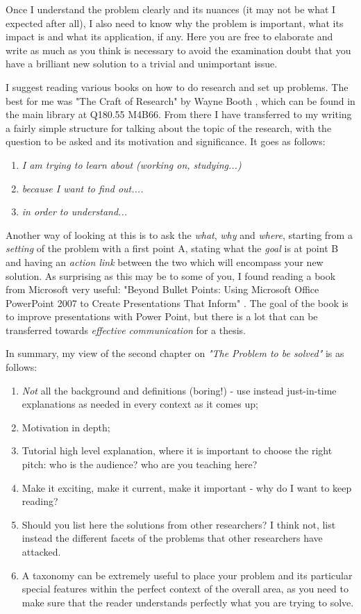 Once I understand the problem clearly and its nuances (it may not be what I expected after all), I also need to know why the problem is important, what its impact is and what its application, if any. Here you are free to elaborate and write as much as you think is necessary to avoid the examination doubt that you have a brilliant new solution to a trivial and unimportant issue.

I suggest reading various books on how to do research and set up problems. The best for me was "The Craft of Research" by Wayne Booth \cite{booth1}, which can be found in the main library at Q180.55 M4B66. From there I have transferred to my writing a fairly simple structure for talking about the topic of the research, with the question to be asked and its motivation and significance. It goes as follows:
\begin{enumerate}
\item {\textit{I am trying to learn about (working on, studying...)}}
\item {\textit{because I want to find out....}}
\item {\textit{in order to understand...}}
\end{enumerate}

Another way of looking at this is to ask the
\textit{what}, \textit{why} and \textit{where}, starting from a \textit{setting} of the problem with a first point A, stating what the \textit{goal} is at point B and having an \textit{action link} between the two which will encompass your new solution. As surprising as this may be to some of you, I found reading a book from Microsoft very useful: "Beyond Bullet Points: Using Microsoft Office PowerPoint 2007 to Create Presentations That Inform" \cite {atkin}. The goal of the book is to improve presentations with Power Point, but there is a lot that can be transferred towards \textit{effective communication} for a thesis.

In summary, my view of the second chapter on
\textit{"The Problem to be solved"} is as follows:
\begin{enumerate}
\item {\textit{Not} all the background and definitions (boring!) - use instead just-in-time explanations as needed in every context as it comes up;}
\item {Motivation in depth;}
\item {Tutorial high level explanation, where it is important to choose the right pitch: who is the audience? who are you teaching here?}
\item {Make it exciting, make it current, make it important - why do I want to keep reading?}
\item {Should you list here the solutions from other researchers? I think not, list instead the different facets of the problems that other researchers have attacked.}
\item {A taxonomy can be extremely useful to place your problem and its particular special features within the perfect context of the overall area, as you need to make sure that the reader understands perfectly what you are trying to solve.}
\end{enumerate}


\setlength{\unitlength}{\savedunitlength}
